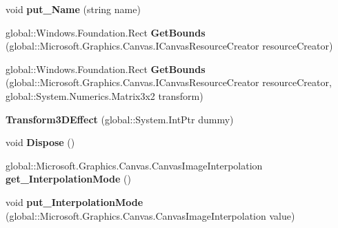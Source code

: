 \begin{DoxyCompactItemize}
void {\bfseries put\+\_\+\+Name} (string name)
\item 
\mbox{\label{class_microsoft_1_1_graphics_1_1_canvas_1_1_effects_1_1_transform3_d_effect_ae3e5b20ce4cd94f594d9b50fc74ee771}} 
global\+::\+Windows.\+Foundation.\+Rect {\bfseries Get\+Bounds} (global\+::\+Microsoft.\+Graphics.\+Canvas.\+I\+Canvas\+Resource\+Creator resource\+Creator)
\item 
\mbox{\label{class_microsoft_1_1_graphics_1_1_canvas_1_1_effects_1_1_transform3_d_effect_a9e9d12b267f452ee3aa3b6b19363d355}} 
global\+::\+Windows.\+Foundation.\+Rect {\bfseries Get\+Bounds} (global\+::\+Microsoft.\+Graphics.\+Canvas.\+I\+Canvas\+Resource\+Creator resource\+Creator, global\+::\+System.\+Numerics.\+Matrix3x2 transform)
\item 
\mbox{\label{class_microsoft_1_1_graphics_1_1_canvas_1_1_effects_1_1_transform3_d_effect_af7099edb8f0d394bed7b6d387eb4c183}} 
{\bfseries Transform3\+D\+Effect} (global\+::\+System.\+Int\+Ptr dummy)
\item 
\mbox{\label{class_microsoft_1_1_graphics_1_1_canvas_1_1_effects_1_1_transform3_d_effect_a9623fd7e2c02c46327c72133773725c1}} 
void {\bfseries Dispose} ()
\item 
\mbox{\label{class_microsoft_1_1_graphics_1_1_canvas_1_1_effects_1_1_transform3_d_effect_a92c6d9ac604d9adcc898ee36205ad9bd}} 
global\+::\+Microsoft.\+Graphics.\+Canvas.\+Canvas\+Image\+Interpolation {\bfseries get\+\_\+\+Interpolation\+Mode} ()
\item 
\mbox{\label{class_microsoft_1_1_graphics_1_1_canvas_1_1_effects_1_1_transform3_d_effect_a38d32bf836b68f42f30afd88937f6280}} 
void {\bfseries put\+\_\+\+Interpolation\+Mode} (global\+::\+Microsoft.\+Graphics.\+Canvas.\+Canvas\+Image\+Interpolation value)
\item 
\mbox{\label{class_microsoft_1_1_graphics_1_1_canvas_1_1_effects_1_1_transform3_d_effect_ad947ca8fd0e8f553756452097191b3e9}} 

\end{DoxyCompactItemize}
